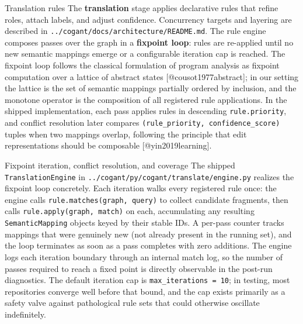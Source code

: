 \documentclass[
  ignorenonframetext,
]{beamer}
\begin{document}
\begin{frame}[fragile]{Translation rules}
\protect{}\label{translation-rules}
The \textbf{translation} stage applies declarative rules that refine
roles, attach labels, and adjust confidence. Concurrency targets and
layering are described in
\texttt{../cogant/docs/architecture/README.md}. The rule engine composes
passes over the graph in a \textbf{fixpoint loop}: rules are re-applied
until no new semantic mappings emerge or a configurable iteration cap is
reached. The fixpoint loop follows the classical formulation of program
analysis as fixpoint computation over a lattice of abstract states
{[}@cousot1977abstract{]}; in our setting the lattice is the set of
semantic mappings partially ordered by inclusion, and the monotone
operator is the composition of all registered rule applications. In the
shipped implementation, each pass applies rules in descending
\texttt{rule.priority}, and conflict resolution later compares
\texttt{(rule\_priority,\ confidence\_score)} tuples when two mappings
overlap, following the principle that edit representations should be
composable {[}@yin2019learning{]}.

\begin{block}{Fixpoint iteration, conflict resolution, and coverage}
\protect{}\label{fixpoint-iteration-conflict-resolution-and-coverage}
The shipped \texttt{TranslationEngine} in
\texttt{../cogant/py/cogant/translate/engine.py} realizes the fixpoint
loop concretely. Each iteration walks every registered rule once: the
engine calls \texttt{rule.matches(graph,\ query)} to collect candidate
fragments, then calls \texttt{rule.apply(graph,\ match)} on each,
accumulating any resulting \texttt{SemanticMapping} objects keyed by
their stable IDs. A per-pass counter tracks mappings that were genuinely
new (not already present in the running set), and the loop terminates as
soon as a pass completes with zero additions. The engine logs each
iteration boundary through an internal match log, so the number of
passes required to reach a fixed point is directly observable in the
post-run diagnostics. The default iteration cap is
\texttt{max\_iterations\ =\ 10}; in testing, most repositories converge
well before that bound, and the cap exists primarily as a safety valve
against pathological rule sets that could otherwise oscillate
indefinitely.


\end{block}
\end{frame}
\end{document}
